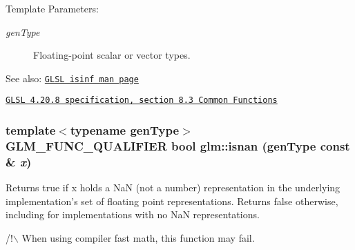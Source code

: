 \begin{Desc}
\item[Template Parameters:]
\begin{description}
\item[{\em genType}]Floating-point scalar or vector types.\end{description}
\end{Desc}
\begin{Desc}
\item[See also:]\href{http://www.opengl.org/sdk/docs/manglsl/xhtml/isinf.xml}{\tt GLSL isinf man page} 

\href{http://www.opengl.org/registry/doc/GLSLangSpec.4.20.8.pdf}{\tt GLSL 4.20.8 specification, section 8.3 Common Functions} \end{Desc}
\hypertarget{group__core__func__common_g64fb2e954341050194ba445111be01f7}{
\subsubsection[isnan]{\setlength{\rightskip}{0pt plus 5cm}template$<$typename genType$>$ GLM\_\-FUNC\_\-QUALIFIER bool glm::isnan (genType const \& {\em x})}}
\label{group__core__func__common_g64fb2e954341050194ba445111be01f7}


Returns true if x holds a NaN (not a number) representation in the underlying implementation's set of floating point representations. Returns false otherwise, including for implementations with no NaN representations.

/!$\backslash$ When using compiler fast math, this function may fail.

